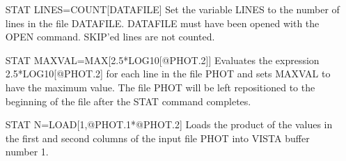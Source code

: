 \begin{itemize}
  \item[STAT LINES=COUNT{[DATAFILE]}\hfill]{ Set the variable LINES to the
       number of lines in the file DATAFILE.  DATAFILE must have been
       opened with the OPEN command.  SKIP'ed lines are not counted.}

  \item[STAT MAXVAL=MAX{[2.5*LOG10{[@PHOT.2]}]}\hfill]{ Evaluates the
       expression 2.5*LOG10{[@PHOT.2]} for each line in the file PHOT and
       sets MAXVAL to have the maximum value.  The file PHOT will be left
       repositioned to the beginning of the file after the STAT command
       completes.}

  \item[STAT N=LOAD{[1,@PHOT.1*@PHOT.2]}\hfill]{ Loads the product of the
       values in the first and second columns of the input file PHOT into
       VISTA buffer number 1.}
\end{itemize}

